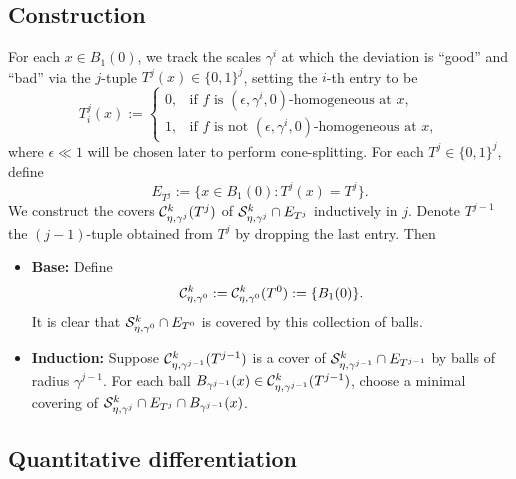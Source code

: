 \subsection{Construction}

For each $x \in B_1 (0)$, we track the scales $\gamma^i$ at which the deviation is ``good'' and ``bad'' via the $j$-tuple $T^j (x)\in \{0, 1\}^j$, setting the $i$-th entry to be 
	\[
		T^j_i (x)
			:=
			\begin{cases}
				0, 		&\text{if $f$ is $(\epsilon, \gamma^i, 0)$-homogeneous at $x$} , \\
				1, 		&\text{if $f$ is not $(\epsilon, \gamma^i, 0)$-homogeneous at $x$},
			\end{cases}
	\]
where $\epsilon \ll 1$ will be chosen later to perform cone-splitting. For each $T^j \in \{0, 1\}^j$, define
	\[ E_{T^j} := \{ x \in B_1 (0) : T^j (x) = T^j \}. \]	
We construct the covers $\mathcal C^k_{\eta, \gamma^j} (T^j)$ of $\mathcal S^k_{\eta, \gamma^j} \cap E_{T^j}$ inductively in $j$. Denote $T^{j - 1}$ the $(j - 1)$-tuple obtained from $T^j$ by dropping the last entry. Then 
\begin{itemize}
	\item \textbf{Base:} Define 
		\[ \mathcal C^k_{\eta, \gamma^0} := \mathcal C^k_{\eta, \gamma^0} (T^0) := \{ B_1 (0)\}.\] 
		It is clear that $\mathcal S^k_{\eta, \gamma^0} \cap E_{T^0}$ is covered by this collection of balls. 
	
	\item \textbf{Induction:} Suppose $\mathcal C^k_{\eta, \gamma^{j - 1}} (T^{j - 1})$ is a cover of $\mathcal S^k_{\eta, \gamma^{j - 1}} \cap E_{T^{j - 1}}$ by balls of radius $\gamma^{j - 1}$. For each ball $B_{\gamma^{j - 1}} (x) \in \mathcal C^k_{\eta, \gamma^{j - 1}} (T^{j - 1})$, choose a minimal covering of $\mathcal S^k_{\eta, \gamma^j} \cap E_{T^j} \cap B_{\gamma^{j - 1}} (x)$. 
	
	
	
	
\end{itemize}



\subsection{Quantitative differentiation}

